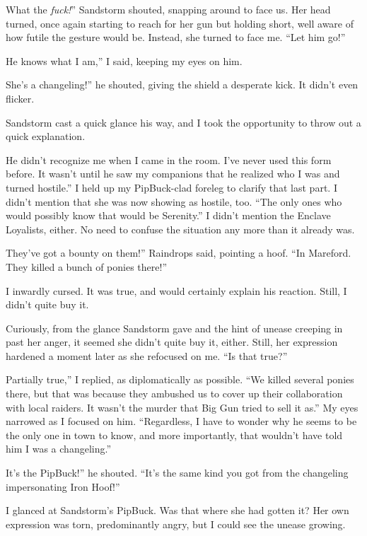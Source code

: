 \leavevmode{}What the \textit{fuck!}” Sandstorm shouted, snapping around to face us. Her head turned, once again starting to reach for her gun but holding short, well aware of how futile the gesture would be. Instead, she turned to face me. “Let him go!”

\leavevmode{}He knows what I am,” I said, keeping my eyes on him.

\leavevmode{}She’s a changeling!” he shouted, giving the shield a desperate kick. It didn’t even flicker.

Sandstorm cast a quick glance his way, and I took the opportunity to throw out a quick explanation.

\leavevmode{}He didn’t recognize me when I came in the room. I’ve never used this form before. It wasn’t until he saw my companions that he realized who I was and turned hostile.” I held up my PipBuck-clad foreleg to clarify that last part. I didn’t mention that she was now showing as hostile, too. “The only ones who would possibly know that would be Serenity.” I didn’t mention the Enclave Loyalists, either. No need to confuse the situation any more than it already was.

\leavevmode{}They’ve got a bounty on them!” Raindrops said, pointing a hoof. “In Mareford. They killed a bunch of ponies there!”

I inwardly cursed. It was true, and would certainly explain his reaction. Still, I didn’t quite buy it.

Curiously, from the glance Sandstorm gave and the hint of unease creeping in past her anger, it seemed she didn’t quite buy it, either. Still, her expression hardened a moment later as she refocused on me. “Is that true?”

\leavevmode{}Partially true,” I replied, as diplomatically as possible. “We killed several ponies there, but that was because they ambushed us to cover up their collaboration with local raiders. It wasn’t the murder that Big Gun tried to sell it as.” My eyes narrowed as I focused on him. “Regardless, I have to wonder why he seems to be the only one in town to know, and more importantly, that wouldn’t have told him I was a changeling.”

\leavevmode{}It’s the PipBuck!” he shouted. “It’s the same kind you got from the changeling impersonating Iron Hoof!”

I glanced at Sandstorm’s PipBuck. Was that where she had gotten it? Her own expression was torn, predominantly angry, but I could see the unease growing.


